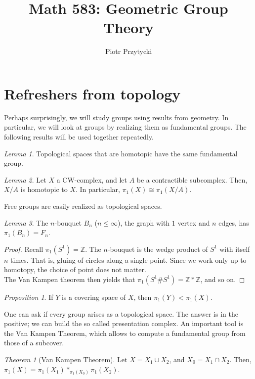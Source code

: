 \documentclass[11pt]{article}
\title{Math 583: Geometric Group Theory}
\author{Piotr Przytycki}
\date{}
\theoremstyle{definition}
\theoremstyle{example}
\theoremstyle{remark}
\theoremstyle{lemma}
\newtheorem{lemma}{Lemma}[section]
\theoremstyle{proposition}
\newtheorem{proposition}{Proposition}[section]
\theoremstyle{Problem}
\theoremstyle{Solution}
\theoremstyle{theorem}
\newtheorem{theorem}{Theorem}[section]
\theoremstyle{corollary}
\begin{document}
\maketitle


\section{Refreshers from topology}
Perhaps surprisingly, we will study groups using results from geometry. In particular, we will look at groups by realizing them as fundamental groups. The following results will be used together repeatedly.
\begin{lemma}
Topological spaces that are homotopic have the same fundamental group. 
\end{lemma}
\begin{lemma}
Let $X$ a CW-complex, and let $A$ be a contractible subcomplex. Then, $X/A$ is homotopic to $X$. In particular, $\pi_1(X) \cong \pi_1(X/A)$.
\end{lemma}

Free groups are easily realized as topological spaces.
\begin{lemma}
The $n$-bouquet $B_n$ ($n\leq \infty$), the graph with $1$ vertex and $n$ edges, has $\pi_1(B_n) = F_n$.
\end{lemma}
\begin{proof}
Recall $\pi_1(S^1)=\mathbb{Z}$. The $n$-bouquet is the wedge product of $S^1$ with itself $n$ times. That is, gluing of circles along a single point. Since we work only up to homotopy, the choice of point does not matter.\\
The Van Kampen theorem then yields that $\pi_1(S^1\# S^1) = \mathbb{Z}*\mathbb{Z}$, and so on.
\end{proof}

\begin{proposition}
If $Y$ is a covering space of $X$, then $\pi_1(Y) < \pi_1(X)$.
\end{proposition}

One can ask if every group arises as a topological space. The answer is in the positive; we can build the so called presentation complex. An important tool is the Van Kampen Theorem, which allows to compute a fundamental group from those of a subcover.
\begin{theorem}[Van Kampen Theorem]
Let $X = X_1\cup X_2$, and $X_0 = X_1\cap X_2$. Then, $\pi_1(X) = \pi_1(X_1) \ast_{\pi_1(X_0)} \pi_1(X_2)$.
\end{theorem}
\end{document}
